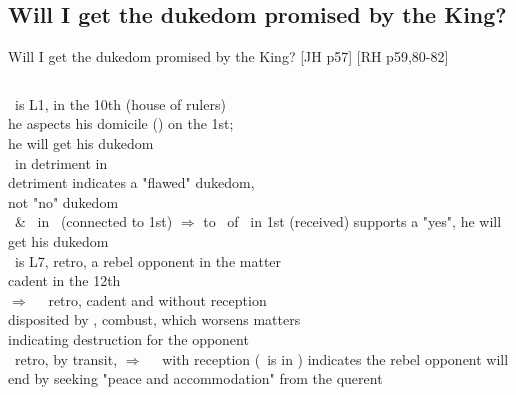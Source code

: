 \subsection{Will I get the dukedom promised by the King?}
\begin{frame}[t]{Will I get the dukedom promised by the King? [JH p57] [RH p59,80-82]}
\begin{columns}[T, onlytextwidth]
\footnotesize
\Jupiter\ is L1, in the 10th (house of rulers)\\
\hspace{1em}he aspects his domicile  (\Sagittarius) on the 1st; \\
\hspace{1em}he will get his dukedom \\
\Jupiter\ in detriment in \Virgo\\ 
\hspace{1em}detriment indicates a "flawed" dukedom, \\
\hspace{1em}not "no" dukedom \\

\vspace{0.5em}
\Sun\ \& \Venus\ in \Sagittarius\ (connected to 1st) $\Rightarrow$ to \Square\ of \Jupiter\ in 1st (received) supports a "yes", he will get his dukedom\\
\vspace{0.5em}
\Mercury\ is L7, retro, a rebel opponent in the matter \\
\hspace{1em}cadent in the 12th \\
\hspace{1em}$\Rightarrow$ \Opposition\ \Saturn\ retro, cadent and without reception \\
\hspace{1em}disposited by \Venus, combust, which worsens matters \\
\hspace{1em}indicating destruction for the opponent \\
\vspace{0.5em}
\Mercury\ retro, by transit, $\Rightarrow$ \Sextile\ \Jupiter\ with reception (\Jupiter\ is in \Virgo) indicates the rebel opponent will end by seeking "peace and accommodation" from the querent


\end{columns}
\end{frame}
